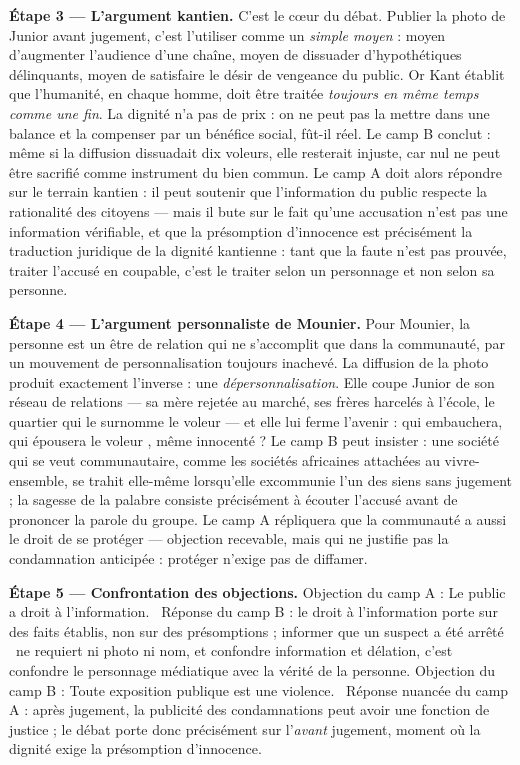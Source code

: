 \documentclass[11pt]{article}
\begin{document}
\begin{exoresolu}
\textbf{Étape 3 — L'argument kantien.} C'est le cœur du débat. Publier la photo de Junior avant jugement, c'est l'utiliser comme un \emph{simple moyen} : moyen d'augmenter l'audience d'une chaîne, moyen de dissuader d'hypothétiques délinquants, moyen de satisfaire le désir de vengeance du public. Or Kant établit que l'humanité, en chaque homme, doit être traitée \emph{toujours en même temps comme une fin}. La dignité n'a pas de prix : on ne peut pas la mettre dans une balance et la compenser par un bénéfice social, fût-il réel. Le camp B conclut : même si la diffusion dissuadait dix voleurs, elle resterait injuste, car nul ne peut être sacrifié comme instrument du bien commun. Le camp A doit alors répondre sur le terrain kantien : il peut soutenir que l'information du public respecte la rationalité des citoyens — mais il bute sur le fait qu'une accusation n'est pas une information vérifiable, et que la présomption d'innocence est précisément la traduction juridique de la dignité kantienne : tant que la faute n'est pas prouvée, traiter l'accusé en coupable, c'est le traiter selon un personnage et non selon sa personne.

\textbf{Étape 4 — L'argument personnaliste de Mounier.} Pour Mounier, la personne est un être de relation qui ne s'accomplit que dans la communauté, par un mouvement de personnalisation toujours inachevé. La diffusion de la photo produit exactement l'inverse : une \emph{dépersonnalisation}. Elle coupe Junior de son réseau de relations — sa mère rejetée au marché, ses frères harcelés à l'école, le quartier qui le surnomme \guillemotleft le voleur \guillemotright — et elle lui ferme l'avenir : qui embauchera, qui épousera \guillemotleft le voleur \guillemotright, même innocenté ? Le camp B peut insister : une société qui se veut communautaire, comme les sociétés africaines attachées au vivre-ensemble, se trahit elle-même lorsqu'elle excommunie l'un des siens sans jugement ; la sagesse de la palabre consiste précisément à écouter l'accusé avant de prononcer la parole du groupe. Le camp A répliquera que la communauté a aussi le droit de se protéger — objection recevable, mais qui ne justifie pas la condamnation anticipée : protéger n'exige pas de diffamer.

\textbf{Étape 5 — Confrontation des objections.} Objection du camp A : \guillemotleft Le public a droit à l'information. \guillemotright\ Réponse du camp B : le droit à l'information porte sur des faits établis, non sur des présomptions ; informer que \guillemotleft un suspect a été arrêté \guillemotright\ ne requiert ni photo ni nom, et confondre information et délation, c'est confondre le personnage médiatique avec la vérité de la personne. Objection du camp B : \guillemotleft Toute exposition publique est une violence. \guillemotright\ Réponse nuancée du camp A : après jugement, la publicité des condamnations peut avoir une fonction de justice ; le débat porte donc précisément sur l'\emph{avant} jugement, moment où la dignité exige la présomption d'innocence.


\end{exoresolu}
\end{document}
